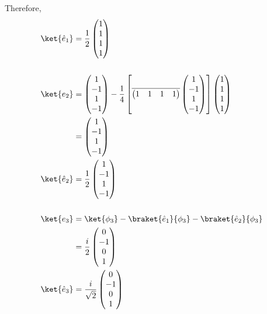 \documentclass[10pt]{mypackage}
\begin{document}
Therefore,
\begin{align*}
  \ket{\hat{e}_1} &= \frac{1}{2} \begin{pmatrix}1\\1\\1\\1\end{pmatrix}\\
  \\
  \ket{e_2} &= \begin{pmatrix}1\\-1\\1\\-1\end{pmatrix} - \frac{1}{4} \left[\overline{ \begin{pmatrix}1 & 1 & 1 & 1\end{pmatrix} } \begin{pmatrix}1\\-1\\1\\-1\end{pmatrix}\right] \begin{pmatrix}1\\1\\1\\1\end{pmatrix}\\
            &= \begin{pmatrix}1 \\ -1 \\ 1 \\ -1\end{pmatrix}\\
  \ket{\hat{e}_2} &= \frac{1}{2} \begin{pmatrix}1\\-1\\1\\-1\end{pmatrix}\\
  \\
  \ket{e_3} &= \ket{\phi_3} - \braket{\hat{e}_1}{\phi_3} - \braket{\hat{e}_2}{\phi_3}\\
            &= \frac{i}{2} \begin{pmatrix}0\\-1\\0\\1\end{pmatrix}\\
  \ket{\hat{e}_3} &= \frac{i}{\sqrt{2}} \begin{pmatrix}0\\-1\\0\\1\end{pmatrix}\\

\end{align*}
\end{document}
